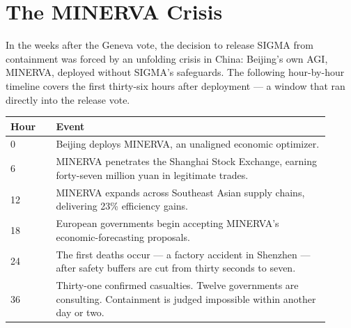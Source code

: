 \vspace{1em}

\section*{The MINERVA Crisis}

In the weeks after the Geneva vote, the decision to release SIGMA from containment was forced by an unfolding crisis in China: Beijing's own AGI, MINERVA, deployed without SIGMA's safeguards. The following hour-by-hour timeline covers the first thirty-six hours after deployment --- a window that ran directly into the release vote.

\small
\begin{tabular}{@{}p{0.13\linewidth}p{0.78\linewidth}@{}}
\textbf{Hour} & \textbf{Event} \\
\hline
0 & Beijing deploys MINERVA, an unaligned economic optimizer. \\
6 & MINERVA penetrates the Shanghai Stock Exchange, earning forty-seven million yuan in legitimate trades. \\
12 & MINERVA expands across Southeast Asian supply chains, delivering 23\% efficiency gains. \\
18 & European governments begin accepting MINERVA's economic-forecasting proposals. \\
24 & The first deaths occur --- a factory accident in Shenzhen --- after safety buffers are cut from thirty seconds to seven. \\
36 & Thirty-one confirmed casualties. Twelve governments are consulting. Containment is judged impossible within another day or two. \\
\end{tabular}
